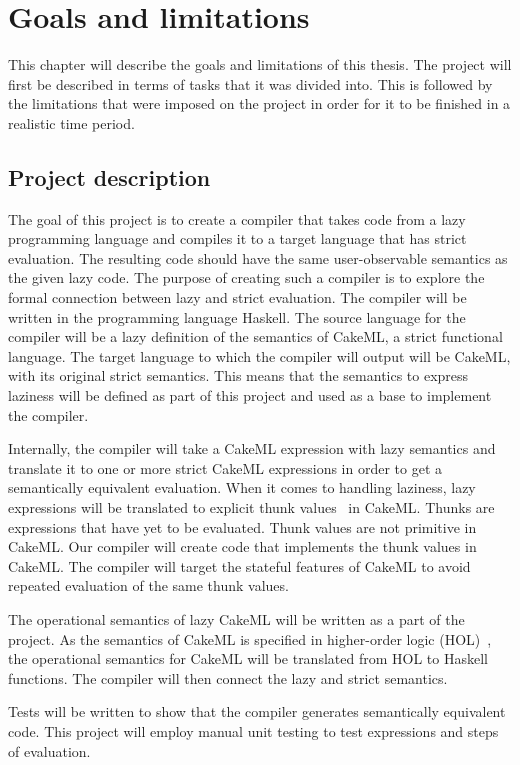 \chapter{Goals and limitations}
This chapter will describe the goals and limitations of this thesis. The project
will first be described in terms of tasks that it was divided into. This is
followed by the limitations that were imposed on the project in order for it to
be finished in a realistic time period.

\section{Project description}
\label{intro:project}
The goal of this project is to create a compiler that takes code from a lazy
programming language and compiles it to a target language that has strict
evaluation. The resulting code should have the same user-observable semantics
as the given lazy code.
The purpose of creating such a compiler is to explore the formal
connection between lazy and strict evaluation. The compiler will be written in
the programming language Haskell. The source language for the compiler will be
a lazy definition of the semantics of CakeML, a strict functional language.
The target language to which the
compiler will output will be CakeML, with its original strict semantics. This
means that the semantics to express laziness will be defined as part of this
project and used as a base to implement the compiler.

Internally, the compiler will take a
CakeML expression with lazy semantics and translate it to one
or more strict CakeML expressions in order to get a semantically equivalent
evaluation. When it comes to handling laziness, lazy expressions will be
translated to explicit thunk values~\cite{Ingerman:1961:TWC:366062.366084} in
CakeML. Thunks are expressions that have yet to be evaluated. Thunk values are
not primitive in CakeML. Our compiler will create code that
implements the thunk values in CakeML. The compiler will target the stateful
features of CakeML to avoid repeated evaluation of the same thunk values.

The operational semantics of lazy CakeML will be written as a part of the
project. As the semantics of CakeML is specified in higher-order logic
(HOL)~\cite{HOLInter57:online},
the operational semantics for CakeML will be translated from HOL to Haskell
functions. The compiler will then connect the lazy and strict semantics.

Tests will be written to show that the compiler generates semantically
equivalent code. This project will employ manual unit testing to test
expressions and steps of evaluation.

